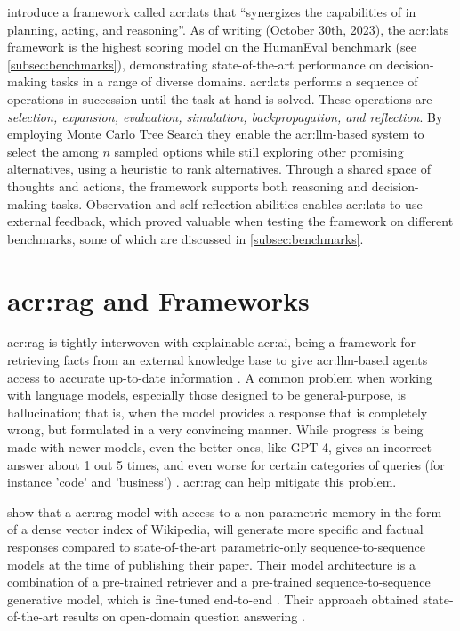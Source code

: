 \cite{zhouLanguageAgentTree2023} introduce a framework called \gls{acr:lats} that \enquote{synergizes the capabilities of  in planning, acting, and reasoning}. As of writing (October 30th, 2023), the \gls{acr:lats} framework is the highest scoring model on the HumanEval benchmark (see \autoref{subsec:benchmarks}), demonstrating state-of-the-art performance on decision-making tasks in a range of diverse domains. \gls{acr:lats} performs a sequence of operations in succession until the task at hand is solved. These operations are \textit{selection, expansion, evaluation, simulation, backpropagation, and reflection}. By employing Monte Carlo Tree Search they enable the \acrshort{acr:llm}-based system to select the among $n$ sampled options while still exploring other promising alternatives, using a heuristic to rank alternatives. Through a shared space of thoughts and actions, the framework supports both reasoning and decision-making tasks. Observation and self-reflection abilities enables \acrshort{acr:lats} to use external feedback, which proved valuable when testing the framework on different benchmarks, some of which are discussed in \autoref{subsec:benchmarks}.



\section[Retrieval Augmented Generation and Frameworks]{\acrlong{acr:rag} and Frameworks}\label{sec:retrieval-automented-generation}

\acrfull{acr:rag} is tightly interwoven with explainable \acrshort{acr:ai}, being a framework for retrieving facts from an external knowledge base to give \acrshort{acr:llm}-based agents access to accurate up-to-date information \citep{martineauWhatRetrievalaugmentedGeneration2023}. A common problem when working with language models, especially those designed to be general-purpose, is hallucination; that is, when the model provides a response that is completely wrong, but formulated in a very convincing manner. While progress is being made with newer models, even the better ones, like GPT-4, gives an incorrect answer about 1 out 5 times, and even worse for certain categories of queries (for instance 'code' and 'business') \citep[10]{openaiGPT4TechnicalReport2023}. \acrlong{acr:rag} can help mitigate this problem.

\cite{lewisRetrievalAugmentedGenerationKnowledgeIntensive2020} show that a \gls{acr:rag} model with access to a non-parametric memory in the form of a dense vector index of Wikipedia, will generate more specific and factual responses compared to state-of-the-art parametric-only sequence-to-sequence models at the time of publishing their paper. Their model architecture is a combination of a pre-trained retriever and a pre-trained sequence-to-sequence generative model, which is fine-tuned end-to-end \citep[2]{lewisRetrievalAugmentedGenerationKnowledgeIntensive2020}. Their approach obtained state-of-the-art results on open-domain question answering \citep[5-6]{lewisRetrievalAugmentedGenerationKnowledgeIntensive2020}.

